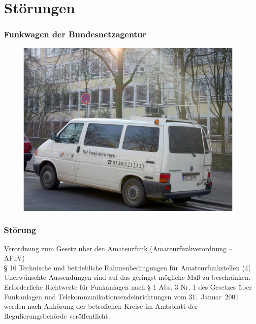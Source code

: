 

\subtitle{Technik A19: \\
  EMV und Sicherheit \\[2em]}
\date{Stand 13.03.2017}


\section*{Störungen}

\begin{frame}
  \frametitle{Funkwagen der Bundesnetzagentur}
  \begin{center}
    \begin{figure}
      \includegraphics[width=1\textwidth,height=.75\textheight,keepaspectratio]{a19/FunkwagenBNetz.jpg}
    \end{figure}
  \end{center}
\end{frame}

\begin{frame}
  \frametitle{Störung}
  \begin{center}
    \begin{block}{Verordnung zum Gesetz über den Amateurfunk (Amateurfunkverordnung -- AFuV) \\
      § 16 Technische und betriebliche Rahmenbedingungen für Amateurfunkstellen}
      (4) Unerwünschte Aussendungen sind auf das geringst mögliche Maß zu beschränken. Erforderliche Richtwerte für Funkanlagen nach § 1 Abs. 3 Nr. 1 des Gesetzes über Funkanlagen und Telekommunikationsendeinrichtungen vom 31.~Januar~2001 werden nach Anhörung der betroffenen Kreise im Amtsblatt der Regulierungsbehörde veröffentlicht.
    \end{block}
  \end{center}
\end{frame}

